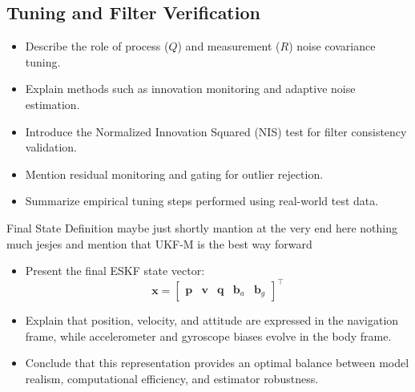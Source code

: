 \subsection{Tuning and Filter Verification}
\begin{itemize}
    \item Describe the role of process ($Q$) and measurement ($R$) noise covariance tuning.
    \item Explain methods such as innovation monitoring and adaptive noise estimation.
    \item Introduce the Normalized Innovation Squared (NIS) test for filter consistency validation.
    \item Mention residual monitoring and gating for outlier rejection.
    \item Summarize empirical tuning steps performed using real-world test data.
\end{itemize}

Final State Definition maybe just shortly mantion at the very end here nothing much jesjes and mention that UKF-M is the best way forward
\begin{itemize}
    \item Present the final ESKF state vector:
    $$
        \mathbf{x} =
        \begin{bmatrix}
            \mathbf{p} & \mathbf{v} & \mathbf{q} & \mathbf{b}_a & \mathbf{b}_g
        \end{bmatrix}^\top
    $$
    \item Explain that position, velocity, and attitude are expressed in the navigation frame, while accelerometer and gyroscope biases evolve in the body frame.
    \item Conclude that this representation provides an optimal balance between model realism, computational efficiency, and estimator robustness.
\end{itemize}